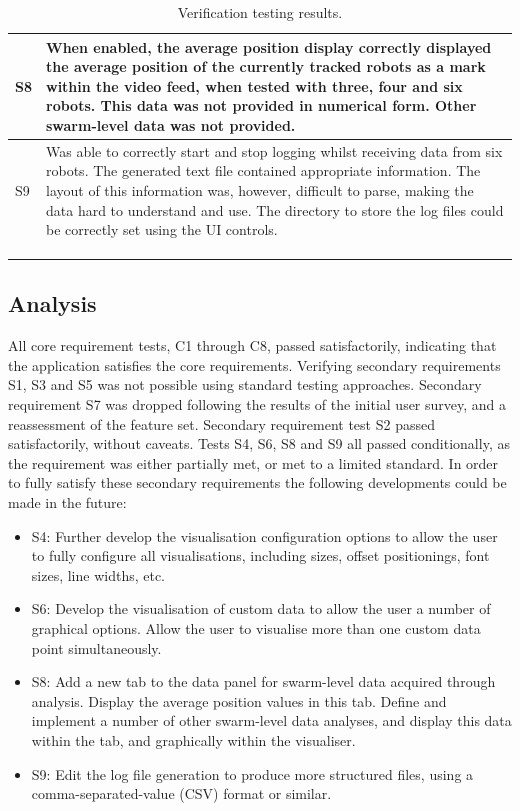 \begin{longtable}{ l p{10cm} }
 S8 & When enabled, the average position display correctly displayed the average position of the currently tracked robots as a mark within the video feed, when tested with three, four and six robots. This data was not provided in numerical form. Other swarm-level data was not provided.\\\hline
 S9 & Was able to correctly start and stop logging whilst receiving data from six robots. The generated text file contained appropriate information. The layout of this information was, however, difficult to parse, making the data hard to understand and use. The directory to store the log files could be correctly set using the UI controls.\\\hline
 \bottomrule\\
 
 \caption[Verification Testing Results]{Verification testing results.}\\
 \label{tab:VerificationTestResults}
\end{longtable}

\subsection{Analysis}
All core requirement tests, C1 through C8, passed satisfactorily, indicating that the application satisfies the core requirements. Verifying secondary requirements S1, S3 and S5 was not possible using standard testing approaches. Secondary requirement S7 was dropped following the results of the initial user survey, and a reassessment of the feature set. Secondary requirement test S2 passed satisfactorily, without caveats. Tests S4, S6, S8 and S9 all passed conditionally, as the requirement was either partially met, or met to a limited standard. In order to fully satisfy these secondary requirements the following developments could be made in the future:

\begin{itemize}
 \item S4: Further develop the visualisation configuration options to allow the user to fully configure all visualisations, including sizes, offset positionings, font sizes, line widths, etc.
 \item S6: Develop the visualisation of custom data to allow the user a number of graphical options. Allow the user to visualise more than one custom data point simultaneously.
 \item S8: Add a new tab to the data panel for swarm-level data acquired through analysis. Display the average position values in this tab. Define and implement a number of other swarm-level data analyses, and display this data within the tab, and graphically within the visualiser.
 \item S9: Edit the log file generation to produce more structured files, using a comma-separated-value (CSV) format or similar.
\end{itemize}


